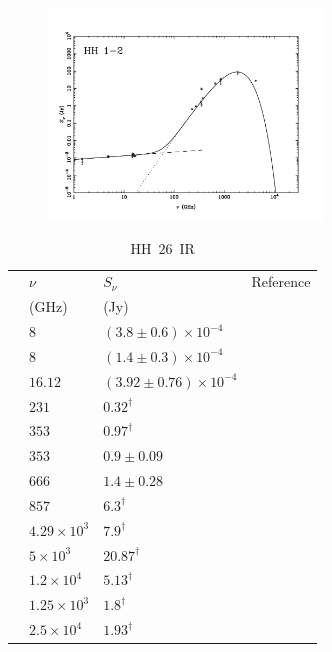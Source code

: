 \documentclass[9pt]{extarticle}   	%
\begin{document}
\begin{figure}[htbp]
\begin{center}
\includegraphics[width=0.65\textwidth]{plots/HH1-2.pdf}
\label{default}
\end{center}
\end{figure}

\clearpage



\begin{table}
\caption{HH~$26$~IR}
\begin{center}
\begin{tabular}{llll}
\hline
 & $\nu$ & $S_\nu$ & Reference\\
 & (GHz) & (Jy) & \\
\hline
 & $8$ & $(3.8\pm0.6)\times10^{-4}$ & \citet{1998AJ....116.2953A}\\
 & $8$ & $(1.4\pm0.3)\times10^{-4}$ & \citet{1999MNRAS.304....1G}\\
 & $16.12$ & $(3.92\pm0.76)\times10^{-4}$ & \citet{2012MNRAS.423.1089A}\\
 & $231$ & $0.32^{\dag}$ & \citet{1999ApJ...527..856L}\\
 & $353$ & $0.97^{\dag}$ & \citet{2008ApJS..175..277D}\\
 & $353$ & $0.9\pm0.09$ & \citet{2007MNRAS.374.1413N}\\
 & $666$ & $1.4\pm0.28$ & \citet{2007MNRAS.374.1413N}\\
 & $857$ & $6.3^{\dag}$ & \citet{1999ApJ...527..856L}\\
 & $4.29\times10^{3}$ & $7.9^{\dag}$ & \citet{2008AA...479..503A}\\
 & $5\times10^{3}$ & $20.87^{\dag}$ & \citet{2008AA...479..503A}\\
 & $1.2\times10^{4}$ & $5.13^{\dag}$ & \citet{2008AA...479..503A}\\
 & $1.25\times10^{3}$ & $1.8^{\dag}$ & \citet{2008AA...479..503A}\\
 & $2.5\times10^{4}$ & $1.93^{\dag}$ & \citet{2008AA...479..503A}\\
\end{tabular}
\end{center}
\label{default}
\end{table}%
\end{document}
